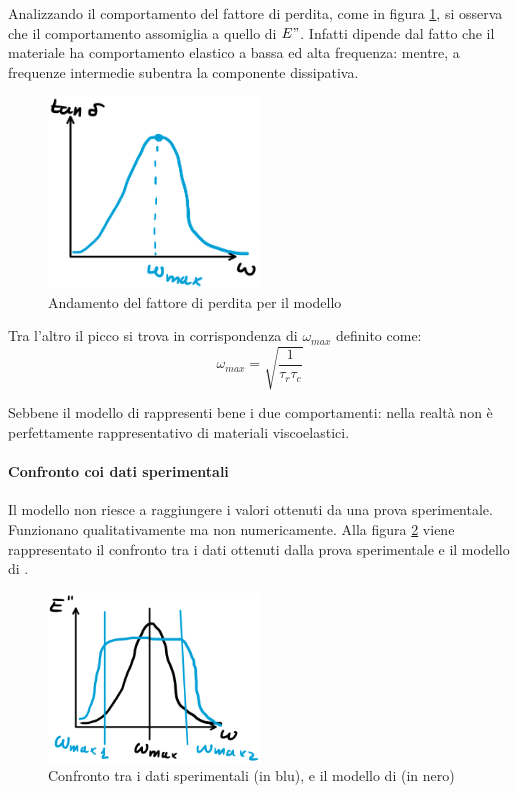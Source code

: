 Analizzando il comportamento del fattore di perdita, come in figura \ref{fig:FattorePerdite}, si osserva che il comportamento assomiglia a quello di $E"$.
Infatti dipende dal fatto che il materiale ha comportamento elastico a bassa ed alta frequenza: mentre, a frequenze intermedie subentra la componente dissipativa.

\begin{figure}
\centering
\includegraphics[width = 0.5\textwidth]{gfx/FattorePerdita}
\caption{Andamento del fattore di perdita per il modello }
\label{fig:FattorePerdite}
\end{figure}

Tra l'altro il picco si trova in corrispondenza di $\omega_{max}$ definito come:
\begin{equation}
\omega_{max} = \sqrt{\frac{1}{\tau_r\tau_c}}
\end{equation}

Sebbene il modello di  rappresenti bene i due comportamenti: nella realtà non è perfettamente rappresentativo di materiali viscoelastici.

\paragraph{Confronto coi dati sperimentali}
Il modello non riesce a raggiungere i valori ottenuti da una prova sperimentale. Funzionano qualitativamente ma non numericamente.
Alla figura \ref{fig:ConfSperimentale} viene rappresentato il confronto tra i dati ottenuti dalla prova sperimentale e il modello di .

\begin{figure}
\centering
\includegraphics[width = 0.5\textwidth]{gfx/ConfSperimentale}
\caption{Confronto tra i dati sperimentali (in blu), e il modello di (in nero)}
\label{fig:ConfSperimentale}
\end{figure}

